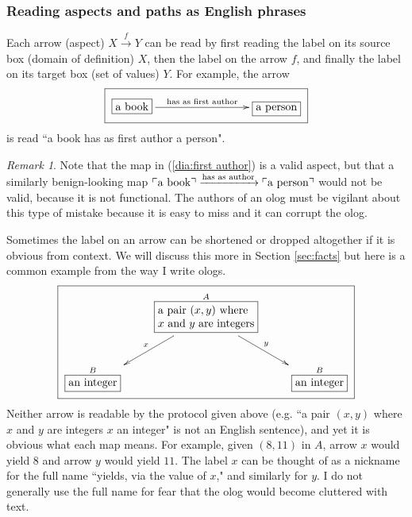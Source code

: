 \documentclass{book}
\def\tn{\textnormal}
\def\rr{\raggedright}
\newcommand{\LA}[2]{\ar[#1]^-{\tn {#2}}}
\newcommand{\obox}[3]{\stackrel{#1}{\fbox{\parbox{#2}{#3}}}}
\newcommand{\smbox}[2]{\stackrel{#1}{\fbox{#2}}}
\newcommand{\fakebox}[1]{\tn{$\ulcorner$#1$\urcorner$}}
\newcommand{\To}[1]{\xrightarrow{#1}}
\theoremstyle{remark}
\newtheorem{remark}[subsubsection]{Remark}
\theoremstyle{definition}
\begin{document}

\subsubsection{Reading aspects and paths as English phrases}

Each arrow (aspect) $X\To{f} Y$ can be read by first reading the label on its source box (domain of definition) $X$, then the label on the arrow $f$, and finally the label on its target box (set of values) $Y$.  For example, the arrow \begin{align}\label{dia:first author}\fbox{\xymatrixnocompile{\smbox{}{a book}\LA{rrr}{has as first author}&&&\smbox{}{a person}}}\end{align} is read ``a book has as first author a person".  

\begin{remark}

Note that the map in (\ref{dia:first author}) is a valid aspect, but that a similarly benign-looking map $\fakebox{a book}\To{\tn{has as author}}\fakebox{a person}$ would not be valid, because it is not functional.  The authors of an olog must be vigilant about this type of mistake because it is easy to miss and it can corrupt the olog.

\end{remark}

Sometimes the label on an arrow can be shortened or dropped altogether if it is obvious from context.  We will discuss this more in Section \ref{sec:facts} but here is a common example from the way I write ologs. \begin{align}\label{dia:pair of integers}\fbox{\xymatrixnocompile{&\obox{A}{1.2in}{\rr a pair $(x,y)$ where $x$ and $y$ are integers}\ar[dl]_x\ar[dr]^y\\\smbox{B}{an integer}&&\smbox{B}{an integer}}}\end{align}  Neither arrow is readable by the protocol given above (e.g. ``a pair $(x,y)$ where $x$ and $y$ are integers $x$ an integer" is not an English sentence), and yet it is obvious what each map means.  For example, given $(8,11)$ in $A$, arrow $x$ would yield $8$ and arrow $y$ would yield $11$.  The label $x$ can be thought of as a nickname for the full name ``yields, via the value of $x$," and similarly for $y$.  I do not generally use the full name for fear that the olog would become cluttered with text.
\end{document}
